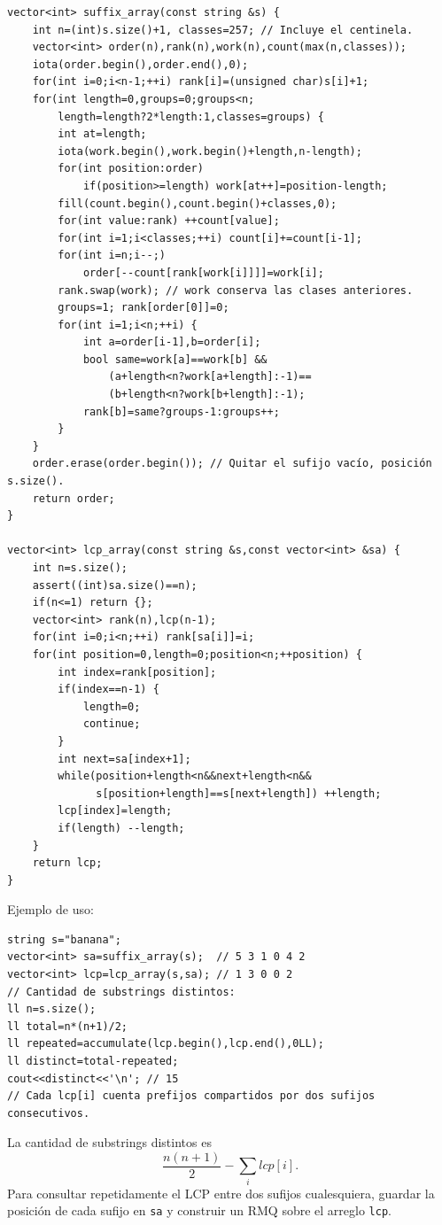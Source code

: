 \begin{lstlisting}[style=cpp]
vector<int> suffix_array(const string &s) {
    int n=(int)s.size()+1, classes=257; // Incluye el centinela.
    vector<int> order(n),rank(n),work(n),count(max(n,classes));
    iota(order.begin(),order.end(),0);
    for(int i=0;i<n-1;++i) rank[i]=(unsigned char)s[i]+1;
    for(int length=0,groups=0;groups<n;
        length=length?2*length:1,classes=groups) {
        int at=length;
        iota(work.begin(),work.begin()+length,n-length);
        for(int position:order)
            if(position>=length) work[at++]=position-length;
        fill(count.begin(),count.begin()+classes,0);
        for(int value:rank) ++count[value];
        for(int i=1;i<classes;++i) count[i]+=count[i-1];
        for(int i=n;i--;)
            order[--count[rank[work[i]]]]=work[i];
        rank.swap(work); // work conserva las clases anteriores.
        groups=1; rank[order[0]]=0;
        for(int i=1;i<n;++i) {
            int a=order[i-1],b=order[i];
            bool same=work[a]==work[b] &&
                (a+length<n?work[a+length]:-1)==
                (b+length<n?work[b+length]:-1);
            rank[b]=same?groups-1:groups++;
        }
    }
    order.erase(order.begin()); // Quitar el sufijo vacío, posición s.size().
    return order;
}

vector<int> lcp_array(const string &s,const vector<int> &sa) {
    int n=s.size();
    assert((int)sa.size()==n);
    if(n<=1) return {};
    vector<int> rank(n),lcp(n-1);
    for(int i=0;i<n;++i) rank[sa[i]]=i;
    for(int position=0,length=0;position<n;++position) {
        int index=rank[position];
        if(index==n-1) {
            length=0;
            continue;
        }
        int next=sa[index+1];
        while(position+length<n&&next+length<n&&
              s[position+length]==s[next+length]) ++length;
        lcp[index]=length;
        if(length) --length;
    }
    return lcp;
}
\end{lstlisting}

Ejemplo de uso:

\begin{lstlisting}[style=cpp]
string s="banana";
vector<int> sa=suffix_array(s);  // 5 3 1 0 4 2
vector<int> lcp=lcp_array(s,sa); // 1 3 0 0 2
// Cantidad de substrings distintos:
ll n=s.size();
ll total=n*(n+1)/2;
ll repeated=accumulate(lcp.begin(),lcp.end(),0LL);
ll distinct=total-repeated;
cout<<distinct<<'\n'; // 15
// Cada lcp[i] cuenta prefijos compartidos por dos sufijos consecutivos.
\end{lstlisting}

La cantidad de substrings distintos es
\[
\frac{n(n+1)}2-\sum_i lcp[i].
\]
Para consultar repetidamente el LCP entre dos sufijos cualesquiera, guardar la
posición de cada sufijo en \texttt{sa} y construir un RMQ sobre el arreglo
\texttt{lcp}.
